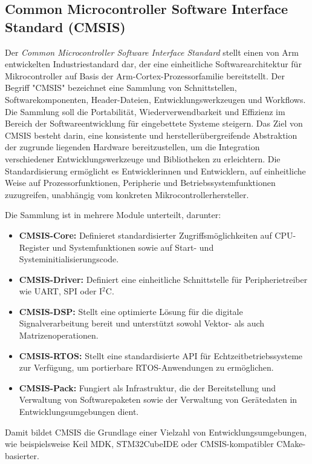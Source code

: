 \subsection*{Common Microcontroller Software Interface Standard (CMSIS)}
Der \emph{Common Microcontroller Software Interface Standard} stellt einen von Arm entwickelten Industriestandard dar, der eine einheitliche Softwarearchitektur für Mikrocontroller auf Basis der Arm-Cortex-Prozessorfamilie bereitstellt.
Der Begriff "CMSIS" bezeichnet eine Sammlung von Schnittstellen, Softwarekomponenten, Header-Dateien, Entwicklungswerkzeugen und Workflows.
 Die Sammlung soll die Portabilität, Wiederverwendbarkeit und Effizienz im Bereich der Softwareentwicklung für eingebettete Systeme steigern.
Das Ziel von CMSIS besteht darin, eine konsistente und herstellerübergreifende Abstraktion der zugrunde liegenden Hardware bereitzustellen, um die Integration verschiedener Entwicklungswerkzeuge und Bibliotheken zu erleichtern.
Die Standardisierung ermöglicht es Entwicklerinnen und Entwicklern, auf einheitliche Weise auf Prozessorfunktionen, Peripherie und Betriebssystemfunktionen zuzugreifen, unabhängig vom konkreten Mikrocontrollerhersteller.

Die Sammlung ist in mehrere Module unterteilt, darunter:
\begin{itemize}
	\item \textbf{CMSIS-Core:} Definieret standardisierter Zugriffsmöglichkeiten auf CPU-Register und Systemfunktionen sowie auf Start- und Systeminitialisierungscode.
	\item \textbf{CMSIS-Driver:} Definiert eine einheitliche Schnittstelle für Peripherietreiber wie UART, SPI oder I$^2$C.
	\item \textbf{CMSIS-DSP:} Stellt eine optimierte Lösung für die digitale Signalverarbeitung bereit und unterstützt sowohl Vektor- als auch Matrizenoperationen.
	\item \textbf{CMSIS-RTOS:} Stellt eine standardisierte API für Echtzeitbetriebssysteme zur Verfügung, um portierbare RTOS-Anwendungen zu ermöglichen.
	\item \textbf{CMSIS-Pack:} Fungiert als Infrastruktur, die der Bereitstellung und Verwaltung von Softwarepaketen sowie der Verwaltung von Gerätedaten in Entwicklungsumgebungen dient.
\end{itemize}

Damit bildet CMSIS die Grundlage einer Vielzahl von Entwicklungsumgebungen, wie beispielsweise Keil MDK, STM32CubeIDE oder CMSIS-kompatibler CMake-basierter.


